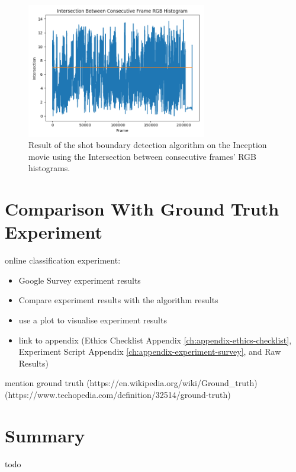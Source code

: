 \begin{figure}[h] 
\centerline{\includegraphics[width=0.70\textwidth]{figures/evaluation/inception_inter_threshold7.png}}
\caption{\label{fig:inception_inter_threshold7}Result of the shot boundary detection algorithm on the Inception movie using the Intersection between consecutive frames' RGB histograms.}
\end{figure}


\section{Comparison With Ground Truth Experiment}

online classification experiment:
    \begin{itemize}
        \item Google Survey experiment results 
        \item Compare experiment results with the algorithm results
        \item use a plot to visualise experiment results
        \item link to appendix (Ethics Checklist Appendix \ref{ch:appendix-ethics-checklist}, Experiment Script Appendix \ref{ch:appendix-experiment-survey}, and Raw Results)
    \end{itemize}
    
mention ground truth (https://en.wikipedia.org/wiki/Ground\_truth) (https://www.techopedia.com/definition/32514/ground-truth)


\section{Summary}

todo